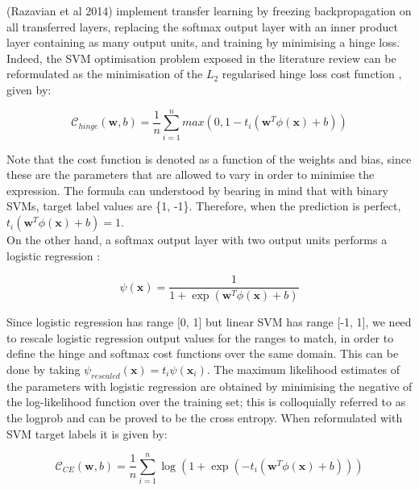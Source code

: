 \documentclass[a4paper,11pt]{article}
\begin{document}
(Razavian et al 2014) implement transfer learning by freezing backpropagation on all transferred layers, replacing the softmax output layer with an inner product layer containing as many output units, and training by minimising a hinge loss. Indeed, the SVM optimisation problem exposed in the literature review can be reformulated as the minimisation of the $L_2$ regularised hinge loss cost function \cite{ML-book}, given by:

\begin{equation}
\mathcal{C}_{hinge}(\textbf{w}, b) = \frac{1}{n}\sum \limits_{i=1}^{n} max(0, 1 - t_i(\textbf{w}^T \phi(\textbf{x}) + b))
\end{equation}

Note that the cost function is denoted as a function of the weights and bias, since these are the parameters that are allowed to vary in order to minimise the expression. The formula can understood by bearing in mind that with binary SVMs, target label values are \{1, -1\}. Therefore, when the prediction is perfect, $t_i(\textbf{w}^T \phi(\textbf{x}) + b) = 1$.\\

On the other hand, a softmax output layer with two output units performs a logistic regression \cite{ML-book}:

\begin{equation}
\psi(\textbf{x}) = \frac{1}{1+\exp(\textbf{w}^T \phi(\textbf{x}) + b)}
\end{equation}

Since logistic regression has range [0, 1] but linear SVM has range [-1, 1], we need to rescale logistic regression output values for the ranges to match, in order to define the hinge and softmax cost functions over the same domain. This can be done by taking $\psi_{rescaled}(\textbf{x}) = t_i \psi(\textbf{x}_i)$. The maximum likelihood estimates of the parameters with logistic regression are obtained by minimising the negative of the log-likelihood function over the training set; this is colloquially referred to as the logprob and can be proved to be the cross entropy. When reformulated with SVM target labels it is given by: 

\begin{equation}
\mathcal{C}_{CE}(\textbf{w}, b) = \frac{1}{n} \sum\limits_{i=1}^{n}\log(1 + \exp(-t_i(\textbf{w}^T \phi(\textbf{x}) + b)))
\end{equation}
\end{document}
